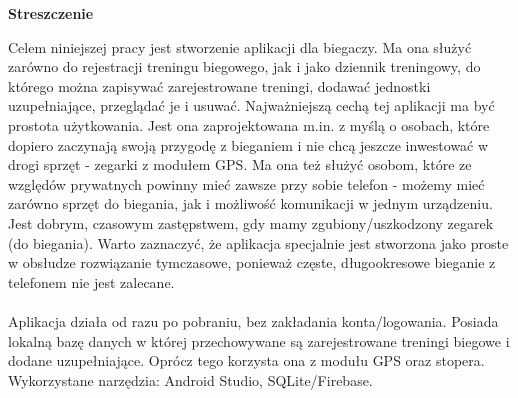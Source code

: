 \documentclass[a4paper,12pt,reqno]{article}
\begin{document}
\begin{flushleft}
	\Large \textbf{Streszczenie}
\end{flushleft}
\vspace{1cm}
Celem niniejszej pracy jest stworzenie aplikacji dla biegaczy. Ma ona służyć zarówno do rejestracji treningu biegowego, jak i jako dziennik treningowy, do którego można zapisywać zarejestrowane treningi, dodawać jednostki uzupełniające, przeglądać je i usuwać. Najważniejszą cechą tej aplikacji ma być prostota użytkowania. Jest ona zaprojektowana m.in. z myślą o osobach, które dopiero zaczynają swoją przygodę z bieganiem i nie chcą jeszcze inwestować w drogi sprzęt - zegarki z modułem GPS. Ma ona też służyć osobom, które ze względów prywatnych powinny mieć zawsze przy sobie telefon - możemy mieć zarówno sprzęt do biegania, jak i możliwość komunikacji w jednym urządzeniu. Jest dobrym, czasowym zastępstwem, gdy mamy zgubiony/uszkodzony zegarek (do biegania). Warto zaznaczyć, że aplikacja specjalnie jest stworzona jako proste w obsłudze rozwiązanie tymczasowe, ponieważ częste, długookresowe bieganie z telefonem nie jest zalecane.\\ \\
Aplikacja działa od razu po pobraniu, bez zakładania konta/logowania. Posiada lokalną bazę danych w której przechowywane są zarejestrowane treningi biegowe i dodane uzupełniające. Oprócz tego korzysta ona z modułu GPS oraz stopera. Wykorzystane narzędzia: Android Studio, SQLite/Firebase.
\end{document}
